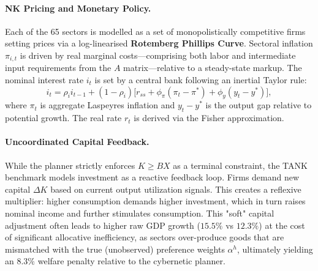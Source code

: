 \paragraph{NK Pricing and Monetary Policy.}
Each of the 65 sectors is modelled as a set of monopolistically competitive firms setting prices via a log-linearised \textbf{Rotemberg Phillips Curve}. Sectoral inflation $\pi_{i,t}$ is driven by real marginal costs---comprising both labor and intermediate input requirements from the $A$ matrix---relative to a steady-state markup. The nominal interest rate $i_t$ is set by a central bank following an inertial Taylor rule:
\begin{equation}
  i_t = \rho_i i_{t-1} + (1 - \rho_i) \bigl[ r_{ss} + \phi_{\pi} (\pi_t - \pi^*) + \phi_y (y_t - y^*) \bigr],
\end{equation}
where $\pi_t$ is aggregate Laspeyres inflation and $y_t - y^*$ is the output gap relative to potential growth. The real rate $r_t$ is derived via the Fisher approximation.


\paragraph{Uncoordinated Capital Feedback.}
While the planner strictly enforces $K \ge BX$ as a terminal constraint, the TANK benchmark models investment as a reactive feedback loop. Firms demand new capital $\Delta K$ based on current output utilization signals. This creates a reflexive multiplier: higher consumption demands higher investment, which in turn raises nominal income and further stimulates consumption. This "soft" capital adjustment often leads to higher raw GDP growth ($15.5\%$ vs $12.3\%$) at the cost of significant allocative inefficiency, as sectors over-produce goods that are mismatched with the true (unobserved) preference weights $\alpha^h$, ultimately yielding an $8.3\%$ welfare penalty relative to the cybernetic planner.

